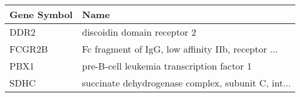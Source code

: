\begin{tabular}{ll}
\toprule
Gene Symbol &                                               Name \\
\midrule
       DDR2 &                        discoidin domain receptor 2 \\
     FCGR2B & Fc fragment of IgG, low affinity IIb, receptor ... \\
       PBX1 &         pre-B-cell leukemia transcription factor 1 \\
       SDHC & succinate dehydrogenase complex, subunit C, int... \\
\bottomrule
\end{tabular}

